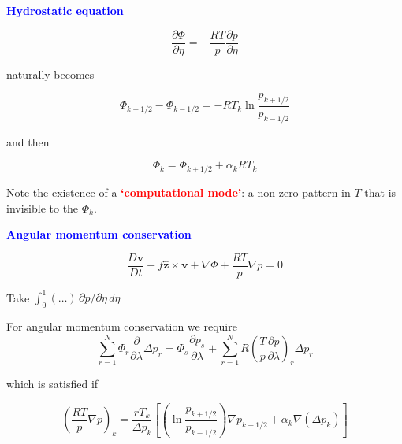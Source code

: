 \documentclass[a4]{seminar}
\newcommand{\R}[1]{\textcolor{red}{#1}}
\newcommand{\B}[1]{\textcolor{blue}{#1}}
\begin{document}
\begin{slide}

\B{\bf Hydrostatic equation}

\begin{displaymath}
\frac{\partial \Phi}{\partial \eta} =
- \frac{R T}{p} \frac{\partial p}{\partial \eta}
\end{displaymath}

naturally becomes

\begin{displaymath}
\Phi_{k+1/2} - \Phi_{k-1/2}
=
- R T_k \ln \frac{p_{k+1/2}}{p_{k-1/2}}
\end{displaymath}

and then

\begin{displaymath}
\Phi_k = \Phi_{k+1/2} +
\alpha_k R T_k
\end{displaymath}

\vspace{2mm}

Note the existence of a \R{\bf `computational mode'}: a non-zero pattern
in \( T \) that is invisible to the \( \Phi_k \).


\end{slide}


\begin{slide}

\B{\bf Angular momentum conservation}

\begin{displaymath}
\frac{D \mathbf{v}}{Dt} + f \hat{\mathbf{z}} \times \mathbf{v}
+ \nabla \Phi +
\frac{R T}{p} \nabla p = 0
\end{displaymath}

Take \( \int_0^1 (\dots) \, \partial p / \partial \eta \, d \eta \)

For angular momentum conservation we require
\begin{displaymath}
\sum_{r=1}^N \Phi_r \frac{\partial}{\partial \lambda} \Delta p_r
=
\Phi_s \frac{\partial p_s}{\partial \lambda}
+
\sum_{r=1}^N R
\left( \frac{T}{p} \frac{\partial p}{\partial \lambda} \right)_r
\Delta p_r
\end{displaymath}

which is satisfied if

\begin{displaymath}
\left( \frac{R T}{p} \nabla p \right)_k
=
\frac{r T_k}{\Delta p_k}
\left[ \left( \ln \frac{p_{k+1/2}}{p_{k-1/2}} \right) \nabla p_{k-1/2}
+ \alpha_k \nabla(\Delta p_k)
\right]
\end{displaymath}



\end{slide}
\end{document}
